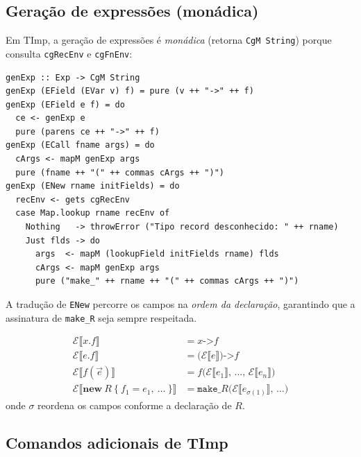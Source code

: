 \subsection{Geração de expressões (monádica)}

Em TImp, a geração de expressões é \emph{monádica} (retorna \texttt{CgM
String}) porque consulta \texttt{cgRecEnv} e \texttt{cgFnEnv}:

\begin{verbatim}
genExp :: Exp -> CgM String
genExp (EField (EVar v) f) = pure (v ++ "->" ++ f)
genExp (EField e f) = do
  ce <- genExp e
  pure (parens ce ++ "->" ++ f)
genExp (ECall fname args) = do
  cArgs <- mapM genExp args
  pure (fname ++ "(" ++ commas cArgs ++ ")")
genExp (ENew rname initFields) = do
  recEnv <- gets cgRecEnv
  case Map.lookup rname recEnv of
    Nothing   -> throwError ("Tipo record desconhecido: " ++ rname)
    Just flds -> do
      args  <- mapM (lookupField initFields rname) flds
      cArgs <- mapM genExp args
      pure ("make_" ++ rname ++ "(" ++ commas cArgs ++ ")")
\end{verbatim}

A tradução de \texttt{ENew} percorre os campos na \emph{ordem da declaração},
garantindo que a assinatura de \texttt{make\_R} seja sempre respeitada.

\begin{Definition}\label{def:timp-exp}
  \begin{align*}
    \mathcal{E}\llbracket x.f \rrbracket
    &= x \texttt{->} f \\
    \mathcal{E}\llbracket e.f \rrbracket
    &= \texttt{(}\mathcal{E}\llbracket e\rrbracket\texttt{)->}f \\
    \mathcal{E}\llbracket f(\vec{e}) \rrbracket
    &= f\texttt{(}\mathcal{E}\llbracket
      e_1\rrbracket\texttt{,\ \ldots,\ }\mathcal{E}\llbracket
    e_n\rrbracket\texttt{)} \\
    \mathcal{E}\llbracket \mathbf{new}\ R\ \{\ f_1 = e_1,\ \ldots\ \} \rrbracket
    &= \texttt{make\_}R\texttt{(}\mathcal{E}\llbracket
    e_{\sigma(1)}\rrbracket\texttt{,\ \ldots)}
  \end{align*}
  onde $\sigma$ reordena os campos conforme a declaração de $R$.
\end{Definition}

\subsection{Comandos adicionais de TImp}

